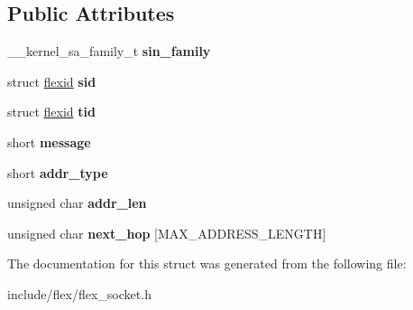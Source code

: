 \subsection*{Public Attributes}
\begin{DoxyCompactItemize}
\item 
\+\_\+\+\_\+kernel\+\_\+sa\+\_\+family\+\_\+t {\bfseries sin\+\_\+family}\hypertarget{structsockaddr__flex_a0bebb0734429c3e6a548fc61de27c9c0}{}\label{structsockaddr__flex_a0bebb0734429c3e6a548fc61de27c9c0}

\item 
struct \hyperlink{structflexid}{flexid} {\bfseries sid}\hypertarget{structsockaddr__flex_ae2d332f61042d379e3521f7e42603037}{}\label{structsockaddr__flex_ae2d332f61042d379e3521f7e42603037}

\item 
struct \hyperlink{structflexid}{flexid} {\bfseries tid}\hypertarget{structsockaddr__flex_a841742293b927751d2c0f8c48d7a5828}{}\label{structsockaddr__flex_a841742293b927751d2c0f8c48d7a5828}

\item 
short {\bfseries message}\hypertarget{structsockaddr__flex_ac1581ee2d027808218f3173c372924a1}{}\label{structsockaddr__flex_ac1581ee2d027808218f3173c372924a1}

\item 
short {\bfseries addr\+\_\+type}\hypertarget{structsockaddr__flex_a8945354761455603e8f09077e454defe}{}\label{structsockaddr__flex_a8945354761455603e8f09077e454defe}

\item 
unsigned char {\bfseries addr\+\_\+len}\hypertarget{structsockaddr__flex_a44a4c4cabcecc77838283ed0a2fe22bb}{}\label{structsockaddr__flex_a44a4c4cabcecc77838283ed0a2fe22bb}

\item 
unsigned char {\bfseries next\+\_\+hop} \mbox{[}M\+A\+X\+\_\+\+A\+D\+D\+R\+E\+S\+S\+\_\+\+L\+E\+N\+G\+TH\mbox{]}\hypertarget{structsockaddr__flex_a6869850bbb4ae164d955372332fffee3}{}\label{structsockaddr__flex_a6869850bbb4ae164d955372332fffee3}

\end{DoxyCompactItemize}


The documentation for this struct was generated from the following file\+:\begin{DoxyCompactItemize}
\item 
include/flex/flex\+\_\+socket.\+h\end{DoxyCompactItemize}
